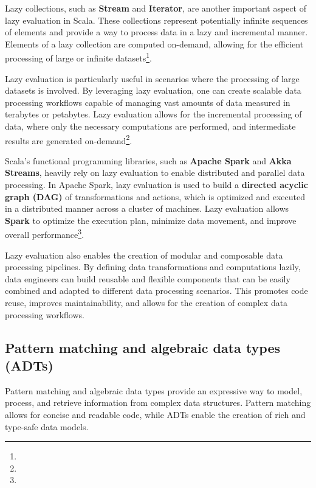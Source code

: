 

Lazy collections, such as \textbf{Stream} and \textbf{Iterator}, are another important aspect of lazy evaluation in Scala. These collections represent potentially infinite sequences of elements and provide a way to process data in a lazy and incremental manner. Elements of a lazy collection are computed on-demand, allowing for the efficient processing of large or infinite datasets\footnote[13]{}.



Lazy evaluation is particularly useful in scenarios where the processing of large datasets is involved. By leveraging lazy evaluation, one can create scalable data processing workflows capable of managing vast amounts of data measured in terabytes or petabytes. Lazy evaluation allows for the incremental processing of data, where only the necessary computations are performed, and intermediate results are generated on-demand\footnote[14]{}.

Scala's functional programming libraries, such as \textbf{Apache Spark} and \textbf{Akka Streams}, heavily rely on lazy evaluation to enable distributed and parallel data processing. In Apache Spark, lazy evaluation is used to build a \textbf{directed acyclic graph (DAG)} of transformations and actions, which is optimized and executed in a distributed manner across a cluster of machines. Lazy evaluation allows \textbf{Spark} to optimize the execution plan, minimize data movement, and improve overall performance\footnote[11]{}.



Lazy evaluation also enables the creation of modular and composable data processing pipelines. By defining data transformations and computations lazily, data engineers can build reusable and flexible components that can be easily combined and adapted to different data processing scenarios. This promotes code reuse, improves maintainability, and allows for the creation of complex data processing workflows\footnotemark[11].



\subsection{Pattern matching and algebraic data types (ADTs)}

Pattern matching and algebraic data types provide an expressive way to model, process, and retrieve information from complex data structures. Pattern matching allows for concise and readable code, while ADTs enable the creation of rich and type-safe data models\footnotemark[11].

